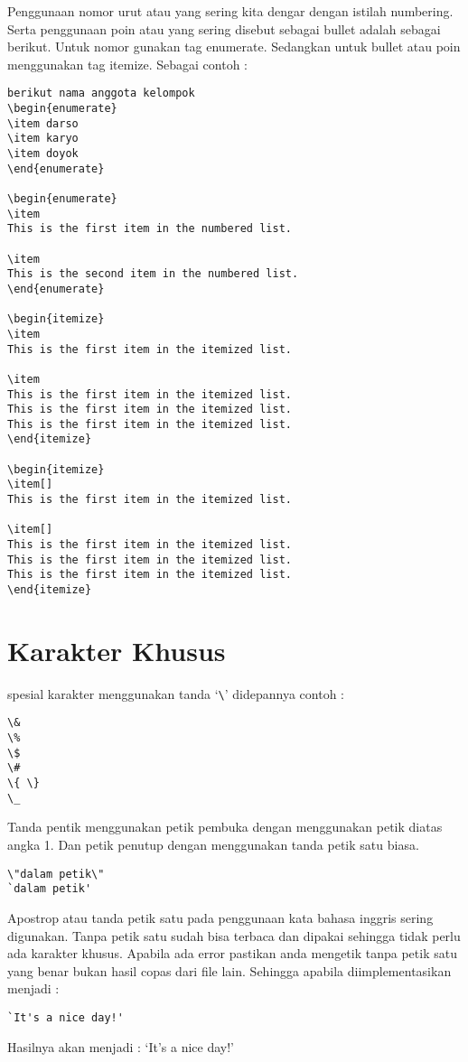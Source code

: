 Penggunaan nomor urut atau yang sering kita dengar dengan istilah numbering. Serta penggunaan poin atau yang sering disebut sebagai bullet adalah sebagai berikut. Untuk nomor gunakan tag enumerate. Sedangkan untuk bullet atau poin menggunakan tag itemize. Sebagai contoh :
\begin{verbatim}
berikut nama anggota kelompok
\begin{enumerate}
\item darso
\item karyo
\item doyok
\end{enumerate}

\begin{enumerate}
\item
This is the first item in the numbered list.

\item
This is the second item in the numbered list.
\end{enumerate}

\begin{itemize}
\item
This is the first item in the itemized list.

\item
This is the first item in the itemized list.
This is the first item in the itemized list.
This is the first item in the itemized list.
\end{itemize}

\begin{itemize}
\item[]
This is the first item in the itemized list.

\item[]
This is the first item in the itemized list.
This is the first item in the itemized list.
This is the first item in the itemized list.
\end{itemize}
\end{verbatim}
    
\section{Karakter Khusus}

spesial karakter menggunakan tanda `\verb|\|' didepannya contoh :
\begin{verbatim}
\& 
\% 
\$ 
\#  
\{ \}
\_
\end{verbatim}

Tanda pentik menggunakan petik pembuka dengan menggunakan petik diatas angka 1. 
Dan petik penutup dengan menggunakan tanda petik satu biasa.
\begin{verbatim}
\"dalam petik\"
`dalam petik'
\end{verbatim} 
Apostrop atau tanda petik satu pada penggunaan kata bahasa inggris sering digunakan. Tanpa petik satu sudah bisa terbaca dan dipakai sehingga tidak perlu ada karakter khusus. Apabila ada error pastikan anda mengetik tanpa petik satu yang benar bukan hasil copas dari file lain. Sehingga apabila diimplementasikan menjadi :
\begin{verbatim}
`It's a nice day!'
\end{verbatim} 
Hasilnya akan menjadi : `It's a nice day!'

